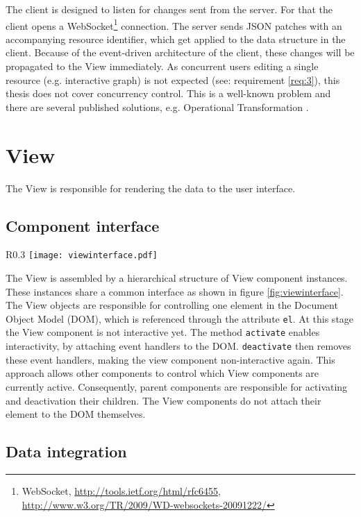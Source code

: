 The client is designed to listen for changes sent from the server. For that the client opens a WebSocket\footnote{WebSocket, \url{http://tools.ietf.org/html/rfc6455}, \url{http://www.w3.org/TR/2009/WD-websockets-20091222/}} connection. The server sends JSON patches with an accompanying resource identifier, which get applied to the data structure in the client. Because of the event-driven architecture of the client, these changes will be propagated to the View immediately. As concurrent users editing a single resource (e.g. interactive graph) is not expected (see: requirement \ref{req:3}), this thesis does not cover concurrency control. This is a well-known problem and there are several published solutions, e.g. Operational Transformation \cite{Ellis_1989}.

\section{View}

The View is responsible for rendering the data to the user interface.

\subsection{Component interface}

\begin{wrapfigure}{R}{0.3\textwidth}
\texttt{[image: viewinterface.pdf]}
\caption{Class diagram of the View component interface}
\label{fig:viewinterface}
\end{wrapfigure}

The View is assembled by a hierarchical structure of View component instances. These instances share a common interface as shown in figure \ref{fig:viewinterface}. The View objects are responsible for controlling one element in the Document Object Model (DOM), which is referenced through the attribute \texttt{el}. At this stage the View component is not interactive yet. The method \texttt{activate} enables interactivity, by attaching event handlers to the DOM. \texttt{deactivate} then removes these event handlers, making the view component non-interactive again. This approach allows other components to control which View components are currently active. Consequently, parent components are responsible for activating and deactivation their children. The View components do not attach their element to the DOM themselves.

\subsection{Data integration}


